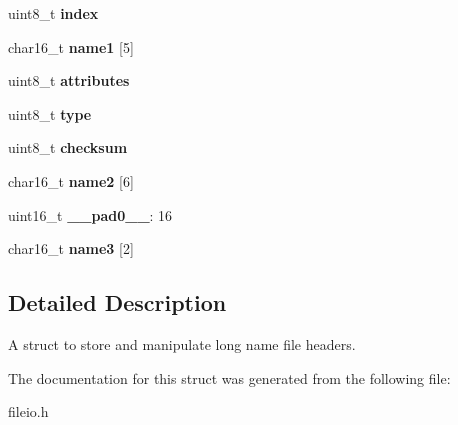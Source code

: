 \begin{DoxyCompactItemize}
\item 
\hypertarget{struct_f_i_l_e___h_e_a_d_e_r___l_o_n_g_n_a_m_e_abd5ddbd4ae0c53f63129db1814743257}{}uint8\+\_\+t {\bfseries index}\label{struct_f_i_l_e___h_e_a_d_e_r___l_o_n_g_n_a_m_e_abd5ddbd4ae0c53f63129db1814743257}

\item 
\hypertarget{struct_f_i_l_e___h_e_a_d_e_r___l_o_n_g_n_a_m_e_a9489d7f4b94ff9968a91f406180f626a}{}char16\+\_\+t {\bfseries name1} \mbox{[}5\mbox{]}\label{struct_f_i_l_e___h_e_a_d_e_r___l_o_n_g_n_a_m_e_a9489d7f4b94ff9968a91f406180f626a}

\item 
\hypertarget{struct_f_i_l_e___h_e_a_d_e_r___l_o_n_g_n_a_m_e_aeddf13d972b639dffc52382540029a1e}{}uint8\+\_\+t {\bfseries attributes}\label{struct_f_i_l_e___h_e_a_d_e_r___l_o_n_g_n_a_m_e_aeddf13d972b639dffc52382540029a1e}

\item 
\hypertarget{struct_f_i_l_e___h_e_a_d_e_r___l_o_n_g_n_a_m_e_a6926d2498a009aeefe3651523a9dc02d}{}uint8\+\_\+t {\bfseries type}\label{struct_f_i_l_e___h_e_a_d_e_r___l_o_n_g_n_a_m_e_a6926d2498a009aeefe3651523a9dc02d}

\item 
\hypertarget{struct_f_i_l_e___h_e_a_d_e_r___l_o_n_g_n_a_m_e_aeac9b53b5abe816dff04cc0f1b1ea519}{}uint8\+\_\+t {\bfseries checksum}\label{struct_f_i_l_e___h_e_a_d_e_r___l_o_n_g_n_a_m_e_aeac9b53b5abe816dff04cc0f1b1ea519}

\item 
\hypertarget{struct_f_i_l_e___h_e_a_d_e_r___l_o_n_g_n_a_m_e_ad9642c97532cf652f1b7e15c59acb269}{}char16\+\_\+t {\bfseries name2} \mbox{[}6\mbox{]}\label{struct_f_i_l_e___h_e_a_d_e_r___l_o_n_g_n_a_m_e_ad9642c97532cf652f1b7e15c59acb269}

\item 
\hypertarget{struct_f_i_l_e___h_e_a_d_e_r___l_o_n_g_n_a_m_e_a1a9373824938d7ba375cf7985cbd1fd6}{}uint16\+\_\+t {\bfseries \+\_\+\+\_\+pad0\+\_\+\+\_\+}\+: 16\label{struct_f_i_l_e___h_e_a_d_e_r___l_o_n_g_n_a_m_e_a1a9373824938d7ba375cf7985cbd1fd6}

\item 
\hypertarget{struct_f_i_l_e___h_e_a_d_e_r___l_o_n_g_n_a_m_e_ae029fe74ed4c7b41505e5f4bccfeb91d}{}char16\+\_\+t {\bfseries name3} \mbox{[}2\mbox{]}\label{struct_f_i_l_e___h_e_a_d_e_r___l_o_n_g_n_a_m_e_ae029fe74ed4c7b41505e5f4bccfeb91d}

\end{DoxyCompactItemize}


\subsection{Detailed Description}
A struct to store and manipulate long name file headers. 

The documentation for this struct was generated from the following file\+:\begin{DoxyCompactItemize}
\item 
fileio.\+h\end{DoxyCompactItemize}
